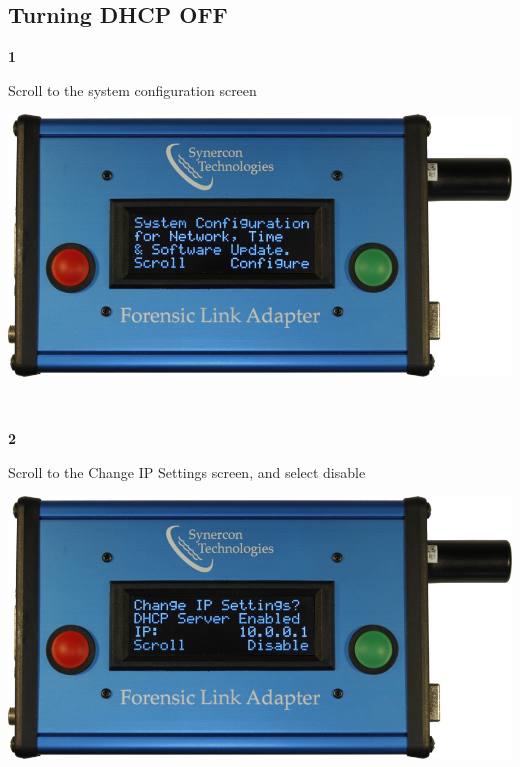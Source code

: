 \documentclass[11pt, oneside]{book}
\begin{document}
\subsection{Turning DHCP OFF}
\noindent\begin{minipage}{0.45\textwidth}%
\begin{center}
\textbf{1}\\[\baselineskip]
\end{center}
Scroll to the system configuration screen
\end{minipage}%
\hfill%
\begin{minipage}{0.45\textwidth}
\includegraphics[width=\linewidth]{../media/fla_screens/ethernet_and_others/main/sys_conf}
\end{minipage}
\\[\baselineskip]
\noindent\begin{minipage}{0.45\textwidth}%
\begin{center}
\textbf{2}\\[\baselineskip]
\end{center}
Scroll to the Change IP Settings screen, and select disable
\end{minipage}%
\hfill%
\begin{minipage}{0.45\textwidth}
\includegraphics[width=\linewidth]{../media/fla_screens/ethernet_and_others/sys_conf/dhcp_enabled}
\end{minipage}
\end{document}
